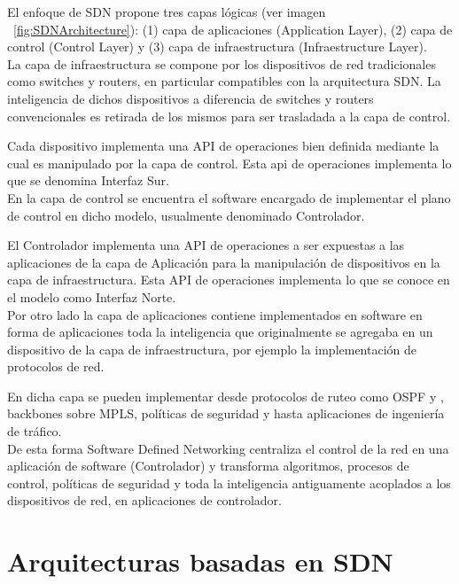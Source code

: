 El enfoque de SDN propone tres capas lógicas (ver imagen ~\ref{fig:SDNArchitecture}): (1) capa de aplicaciones (Application Layer), (2) capa de control (Control Layer) y (3) capa de infraestructura  
 (Infraestructure Layer).\\

La capa de infraestructura se compone por los dispositivos de red tradicionales como switches y routers, en particular compatibles con la arquitectura SDN. La inteligencia de dichos dispositivos a diferencia de switches y routers convencionales es retirada de los mismos para ser trasladada a la capa de control.

Cada dispositivo implementa una API de operaciones bien definida mediante la cual es manipulado por la capa de control. Esta api de operaciones implementa lo que se denomina Interfaz Sur.
\\

En la capa de control se encuentra el software encargado de implementar el plano de control en dicho modelo, usualmente denominado Controlador.

El Controlador implementa una API de operaciones a ser expuestas a las aplicaciones de la capa de Aplicación para la manipulación de dispositivos en la capa de infraestructura. Esta API de operaciones implementa lo que se conoce en el modelo como Interfaz Norte.\\

Por otro lado la capa de aplicaciones contiene implementados en software en forma de aplicaciones toda la inteligencia que originalmente se agregaba en un dispositivo de la capa de infraestructura, por ejemplo la implementaci\'on de protocolos de red.

En dicha capa se pueden implementar desde protocolos de ruteo como OSPF y , backbones sobre MPLS, políticas de seguridad y hasta aplicaciones de ingeniería de tráfico.\\

De esta forma Software Defined Networking centraliza el control de la red en una aplicación de software  
 (Controlador) y transforma algoritmos, procesos de control, políticas de seguridad y toda la inteligencia antiguamente acoplados a los dispositivos de red, en aplicaciones de controlador.\\

\section{Arquitecturas basadas en SDN}
\label{section2.3}

